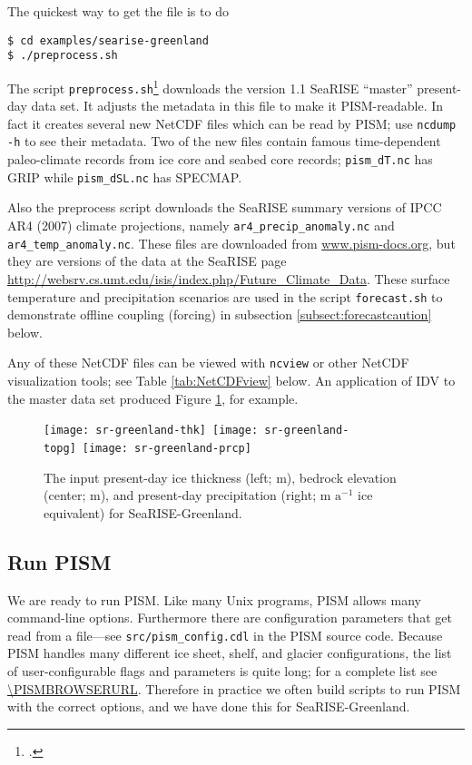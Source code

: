 \noindent The quickest way to get the file is to do
\begin{verbatim}
$ cd examples/searise-greenland
$ ./preprocess.sh
\end{verbatim}
\noindent The script \texttt{preprocess.sh}\footnote{.} downloads the version 1.1 SeaRISE ``master'' present-day data set.  It adjusts the metadata in this file to make it PISM-readable.  In fact it creates several new NetCDF files which can be read by PISM; use \texttt{ncdump -h} to see their metadata.  Two of the new files contain famous time-dependent paleo-climate records from ice core and seabed core records; \texttt{pism_dT.nc} has GRIP while \texttt{pism_dSL.nc} has SPECMAP.

Also the preprocess script downloads the SeaRISE summary versions of IPCC AR4 (2007) climate projections, namely \texttt{ar4_precip_anomaly.nc} and \texttt{ar4_temp_anomaly.nc}.  These files are downloaded from \href{http://www.pism-docs.org/}{www.pism-docs.org}, but they are versions of the data at the SeaRISE page \url{http://websrv.cs.umt.edu/isis/index.php/Future_Climate_Data}.  These surface temperature and precipitation scenarios are used in the script \texttt{forecast.sh} to demonstrate offline coupling (forcing) in subsection \ref{subsect:forecastcaution} below.

Any of these NetCDF files can be viewed with \texttt{ncview} or other NetCDF visualization tools; see Table \ref{tab:NetCDFview} below.  An application of IDV to the master data set produced Figure \ref{fig:sr-input}, for example.

\begin{figure}[ht]
\centering
\mbox{\texttt{[image: sr-greenland-thk]}
  \qquad
  \texttt{[image: sr-greenland-topg]}
  \qquad
  \texttt{[image: sr-greenland-prcp]}}
\caption{The input present-day ice thickness (left; m), bedrock elevation (center; m), and present-day precipitation (right; m $\text{a}^{-1}$ ice equivalent) for SeaRISE-Greenland.}
\label{fig:sr-input}
\end{figure}


\subsection{Run PISM}   \label{subsect:runscript}  We are ready to run PISM.  Like many Unix programs, PISM allows many command-line options.  Furthermore there are configuration parameters that get read from a file---see \mbox{\texttt{src/pism_config.cdl}} in the PISM source code.  Because PISM handles many different ice sheet, shelf, and glacier configurations, the list of user-configurable flags and parameters is quite long; for a complete list see \url{\PISMBROWSERURL}.  Therefore in practice we often build scripts to run PISM with the correct options, and we have done this for \mbox{SeaRISE-Greenland}.

